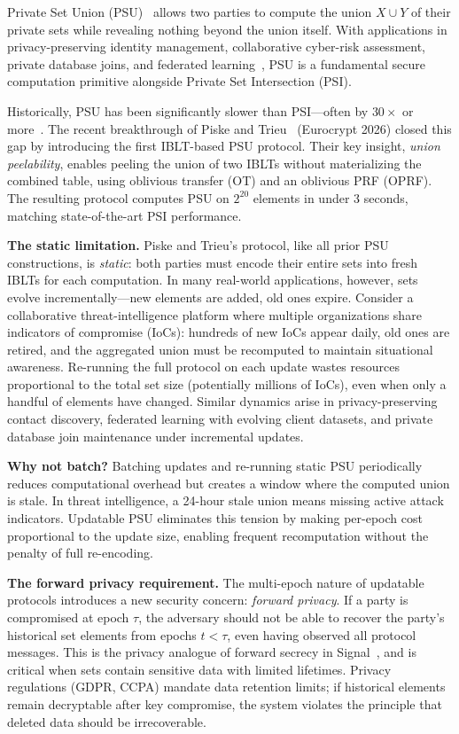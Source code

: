 \documentclass[letterpaper,twocolumn,10pt]{article}
\theoremstyle{definition}
\begin{document}
Private Set Union (PSU)~\cite{KRT19,JLZ20,ZCL+23,Tu+25} allows two parties to
compute the union $X \cup Y$ of their private sets while revealing nothing
beyond the union itself. With applications in privacy-preserving identity
management, collaborative cyber-risk assessment, private database joins, and
federated learning~\cite{DCW13,IKN+20,KRS+19}, PSU is a fundamental secure
computation primitive alongside Private Set Intersection (PSI).

Historically, PSU has been significantly slower than PSI---often by $30\times$
or more~\cite{PT26,KRT19}. The recent breakthrough of Piske and
Trieu~\cite{PT26} (Eurocrypt 2026) closed this gap by introducing the first
IBLT-based PSU protocol. Their key insight, \emph{union peelability}, enables
peeling the union of two IBLTs without materializing the combined table, using
oblivious transfer (OT) and an oblivious PRF (OPRF). The resulting protocol
computes PSU on $2^{20}$ elements in under 3 seconds, matching state-of-the-art
PSI performance.

\textbf{The static limitation.} Piske and Trieu's protocol, like all prior PSU
constructions, is \emph{static}: both parties must encode their entire sets into
fresh IBLTs for each computation. In many real-world applications, however,
sets evolve incrementally---new elements are added, old ones expire. Consider a
collaborative threat-intelligence platform where multiple organizations share
indicators of compromise (IoCs): hundreds of new IoCs appear daily, old ones are
retired, and the aggregated union must be recomputed to maintain situational
awareness. Re-running the full protocol on each update wastes resources
proportional to the total set size (potentially millions of IoCs), even when
only a handful of elements have changed. Similar dynamics arise in
privacy-preserving contact discovery, federated learning with evolving client
datasets, and private database join maintenance under incremental updates.

\textbf{Why not batch?} Batching updates and re-running static PSU periodically
reduces computational overhead but creates a window where the computed union is
stale. In threat intelligence, a 24-hour stale union means missing active
attack indicators. Updatable PSU eliminates this tension by making per-epoch
cost proportional to the update size, enabling frequent recomputation without
the penalty of full re-encoding.

\textbf{The forward privacy requirement.} The multi-epoch nature of updatable
protocols introduces a new security concern: \emph{forward privacy}. If a party
is compromised at epoch $\tau$, the adversary should not be able to recover the
party's historical set elements from epochs $t < \tau$, even having observed all
protocol messages. This is the privacy analogue of forward secrecy in
Signal~\cite{Signal}, and is critical when sets contain sensitive data with
limited lifetimes. Privacy regulations (GDPR, CCPA) mandate data retention
limits; if historical elements remain decryptable after key compromise, the
system violates the principle that deleted data should be irrecoverable.
\end{document}
